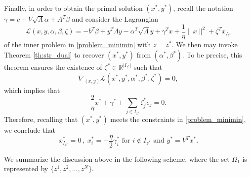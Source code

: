 \documentclass[smallextended,referee,envcountsect]{svjour3}
\newcommand{\R}{\mathbb{R}}
\begin{document}
Finally, in order to obtain the primal solution $(x^*,y^*)$, recall the notation 
$\gamma=c+V\sqrt{\Lambda}\alpha+A^T\beta$ and consider the Lagrangian 
$$
\mathcal{L}(x,y,\alpha,\beta,\zeta) = 
-b^T\beta+y^T\Lambda{y}-\alpha^T\sqrt{\Lambda}y + 
\gamma^Tx+\frac{1}{\eta}\|x\|^2 + \zeta^Tx_{I_{z^*}}
$$
of the inner problem in \eqref{problem_minimin} with $z=z^*$. We then may invoke 
Theorem \ref{th:str_dual} to recover $(x^*,y^*)$ from $(\alpha^*,\beta^*)$. To be 
precise, this theorem ensures the existence of $\zeta^*\in\R^{|I_{z^*}|}$ such that 
$$
\nabla_{(x,y)}\mathcal{L}(x^*,y^*,\alpha^*,\beta^*,\zeta^*) = 0,
$$
which implies that 
$$
\frac{2}{\eta}x^*+\gamma^*+\sum\limits_{j\in I_{z^*}}\zeta_j^*e_j = 0.
$$
Therefore, recalling that $(x^*,y^*)$ meets the constraints 
in \eqref{problem_minimin}, we conclude that 
\begin{equation}
\label{primal_solution}
x_{I_{z^*}}^*=0\,,\;x_i^*=-\frac{\eta}{2}\gamma_i^*\mbox{ for }i\notin I_{z^*}
\mbox{ and } y^*=V^Tx^*.
\end{equation}

We summarize the discussion above in the following scheme, where the set $\Omega_1$ 
is represented by $\{z^1, z^2, \ldots, z^N\}$.
\end{document}
